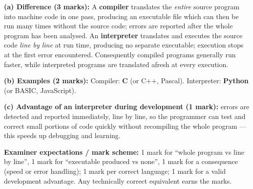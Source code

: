 \documentclass[11pt]{article}
\begin{document}
\begin{corrige}
\textbf{(a) Difference (3 marks):} A \textbf{compiler} translates the \emph{entire} source program into machine code in one pass, producing an executable file which can then be run many times without the source code; errors are reported after the whole program has been analysed. An \textbf{interpreter} translates and executes the source code \emph{line by line} at run time, producing no separate executable; execution stops at the first error encountered. Consequently compiled programs generally run faster, while interpreted programs are translated afresh at every execution.

\textbf{(b) Examples (2 marks):} Compiler: \textbf{C} (or C++, Pascal). Interpreter: \textbf{Python} (or BASIC, JavaScript).

\textbf{(c) Advantage of an interpreter during development (1 mark):} errors are detected and reported immediately, line by line, so the programmer can test and correct small portions of code quickly without recompiling the whole program — this speeds up debugging and learning.

\textbf{Examiner expectations / mark scheme:} 1 mark for ``whole program vs line by line'', 1 mark for ``executable produced vs none'', 1 mark for a consequence (speed or error handling); 1 mark per correct language; 1 mark for a valid development advantage. Any technically correct equivalent earns the marks.
\end{corrige}
\end{document}
